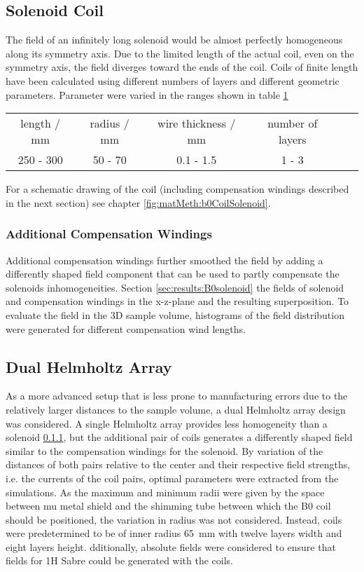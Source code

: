         \subsection{Solenoid Coil}
        The field of an infinitely long solenoid would be almost perfectly homogeneous along its symmetry axis. Due to the limited length of the actual coil, even on the symmetry axis, the field diverges toward the ends of the coil. Coils of finite length have been calculated using different numbers of layers and different geometric parameters. Parameter were varied in the ranges shown in table \ref{table:simulations:solenoidParameters}
        \begin{table} 
            \label{table:simulations:solenoidParameters}
            \centering
            \begin{tabular}{cccccc}
                length / mm & radius / mm & wire thickness / mm & number of layers \\
                250 - 300 & 50 - 70 & 0.1 - 1.5 & 1 - 3
            \end{tabular}
        \end{table}
        For a schematic drawing of the coil (including compensation windings described in the next section) see chapter \ref{fig:matMeth:b0CoilSolenoid}.

        \subsubsection{Additional Compensation Windings}
        Additional compensation windings further smoothed the field by adding a differently shaped field component that can be used to partly compensate the solenoids inhomogeneities. Section \ref{sec:results:B0solenoid} the fields of solenoid and compensation windings in the x-z-plane and the resulting superposition.
            To evaluate the field in the 3D sample volume, histograms of the field distribution were generated for different compensation wind lengths. 
        \subsection{Dual Helmholtz Array}\label{simulations:DualHelmholtzArray}
        As a more advanced setup that is less prone to manufacturing errors due to the relatively larger distances to the sample volume, a dual Helmholtz array design was considered. A single Helmholtz array provides less homogeneity than a solenoid \ref{}, but the additional pair of coils generates a differently shaped field similar to the compensation windings for the solenoid. By variation of the distances of both pairs relative to the center and their respective field strengths, i.e. the currents of the coil pairs, optimal parameters were extracted from the simulations. As the maximum and minimum radii were given by the space between mu metal shield and the shimming tube between which the B0 coil should be positioned, the variation in radius was not considered. Instead, coils were predetermined to be of inner radius \SI{65}{\mm} with twelve layers width and eight layers height.
        dditionally, absolute fields were considered to ensure that fields for 1H Sabre could be generated with the coils.
